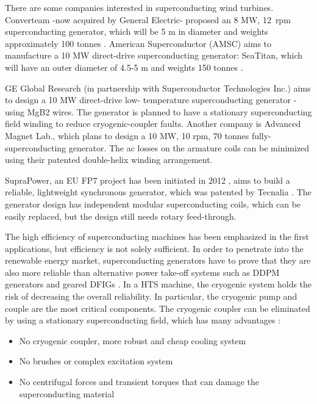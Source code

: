 \documentclass[a4paper, 11pt]{article} %
\begin{document}
There are some companies interested in superconducting wind turbines. Converteam -now acquired by General Electric- proposed an 8 MW, 12~rpm superconducting generator, which will be 5 m in diameter and weights approximately 100 tonnes \cite{Lewis2007}. American Superconductor (AMSC) aims to manufacture a 10 MW direct-drive superconducting generator: SeaTitan, which will have an outer diameter of 4.5-5 m and weights 150 tonnes \cite{Snitchler2011}.

GE Global Research (in partnership with Superconductor Technologies Inc.) aims to design a 10 MW direct-drive low- temperature superconducting generator -using MgB2 wires. The generator is planned to have a stationary superconducting field winding to reduce cryogenic-coupler faults. Another company is Advanced Magnet Lab., which plans to design a 10 MW, 10 rpm, 70 tonnes fully-superconducting generator. The ac losses on the armature coils can be minimized using their patented double-helix winding arrangement.

SupraPower, an EU FP7 project has been initiated in 2012 \cite{suprapower}, aims to build a reliable, lightweight synchronous generator, which was patented by Tecnalia \cite{SarmientoMunoz2011}. The generator design has independent modular superconducting coils, which can be easily replaced, but the design still needs rotary feed-through.

The high efficiency of superconducting machines has been emphasized in the first applications, but efficiency is not solely sufficient. In order to penetrate into the renewable energy market,  superconducting generators have to prove that they are also more reliable than alternative power take-off systems such as DDPM generators and geared DFIGs \cite{Abrahamsen2010}. In a HTS machine, the cryogenic system holds the risk of decreasing the overall reliability. In particular, the cryogenic pump and couple are the most critical components. The cryogenic coupler can be eliminated by using a stationary superconducting field, which has many advantages \cite{Gieras2008a,Keysan2011e}:

\begin{itemize}
	\item No cryogenic coupler, more robust and cheap cooling system
	\item No brushes or complex excitation system
	\item No centrifugal forces and transient torques that can damage the superconducting material
\end{itemize}
\end{document}
